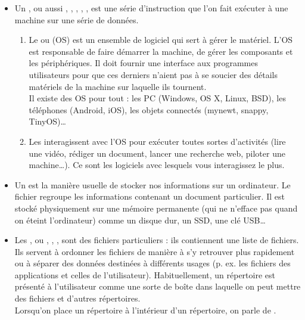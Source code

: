 \documentclass[10pt,a4paper]{report}
\begin{document}
\begin{itemize}
	\item Un , ou aussi , , , , , est une série d'instruction que l'on fait exécuter à une machine sur une série de données.
		\begin{enumerate}
			\item Le  ou  (OS) est un ensemble de logiciel qui sert à gérer le matériel. L'OS est responsable de faire démarrer la machine, de gérer les composants et les périphériques. Il doit fournir une interface aux programmes utilisateurs pour que ces derniers n'aient pas à se soucier des détails matériels de la machine sur laquelle ils tournent.\\[1ex]
			Il existe des OS pour tout : les PC (Windows, OS X, Linux, BSD), les téléphones (Android, iOS), les objets connectés (mynewt, snappy, TinyOS)\dots
			\item Les  interagissent avec l'OS pour exécuter toutes sortes d'activités (lire une vidéo, rédiger un document, lancer une recherche web, piloter une machine\dots). Ce sont les logiciels avec lesquels vous interagissez le plus.
		\end{enumerate}
	\item Un  est la manière usuelle de stocker nos informations sur un ordinateur. Le fichier regroupe les informations contenant un document particulier. Il est stocké physiquement sur une mémoire permanente (qui ne n'efface pas quand on éteint l'ordinateur) comme un disque dur, un SSD, une clé USB\dots
	\item Les , ou , , , sont des fichiers particuliers : ils contiennent une liste de fichiers. Ils servent à ordonner les fichiers de manière à s'y retrouver plus rapidement ou à séparer des données destinées à différents usages (p. ex. les fichiers des applications et celles de l'utilisateur). Habituellement, un répertoire est présenté à l'utilisateur comme une sorte de boîte dans laquelle on peut mettre des fichiers et d'autres répertoires. \\[1ex]
		Lorsqu'on place un répertoire à l'intérieur d'un répertoire, on parle de .
\end{itemize}

\end{document}
